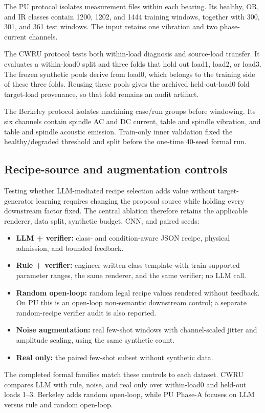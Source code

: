 \documentclass[a4paper,fleqn]{cas-sc}
\begin{document}
The PU protocol isolates measurement files within each bearing. Its healthy,
OR, and IR classes contain 1200, 1202, and 1444 training windows, together with
300, 301, and 361 test windows. The input retains one vibration and two
phase-current channels.

The CWRU protocol tests both within-load diagnosis and source-load transfer. It
evaluates a within-load0 split and three folds that hold out load1, load2, or
load3. The frozen synthetic pools derive from load0, which belongs to the
training side of these three folds. Reusing these pools gives the archived
held-out-load0 fold target-load provenance, so that fold remains an audit
artifact.

The Berkeley protocol isolates machining case/run groups before windowing. Its
six channels contain spindle AC and DC current, table and spindle vibration,
and table and spindle acoustic emission. Train-only inner validation fixed the
healthy/degraded threshold and split before the one-time 40-seed formal run.

\subsection{Recipe-source and augmentation controls}

Testing whether LLM-mediated recipe selection adds value without target-generator learning
requires changing the proposal source while holding every downstream factor
fixed. The central ablation therefore retains the applicable renderer, data
split, synthetic budget, CNN, and paired seeds:
\begin{itemize}
  \item \textbf{LLM + verifier:} class- and condition-aware JSON recipe,
  physical admission, and bounded feedback.
  \item \textbf{Rule + verifier:} engineer-written class template with
  train-supported parameter ranges, the same renderer, and the same verifier;
  no LLM call.
  \item \textbf{Random open-loop:} random legal recipe values rendered without
  feedback. On PU this is an open-loop non-semantic downstream control; a
  separate random-recipe verifier audit is also reported.
  \item \textbf{Noise augmentation:} real few-shot windows with channel-scaled
  jitter and amplitude scaling, using the same synthetic count.
  \item \textbf{Real only:} the paired few-shot subset without synthetic data.
\end{itemize}
The completed formal families match these controls to each dataset. CWRU
compares LLM with rule, noise, and real only over within-load0 and held-out
loads 1--3. Berkeley adds random open-loop, while PU Phase-A focuses on LLM
versus rule and random open-loop.
\end{document}

